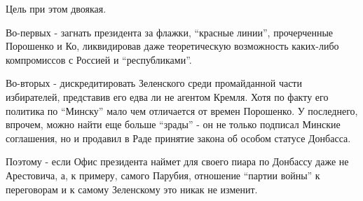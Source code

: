 Цель при этом двоякая.

Во-первых - загнать президента за флажки, \enquote{красные линии}, прочерченные
Порошенко и Ко, ликвидировав даже теоретическую возможность каких-либо
компромиссов с Россией и \enquote{республиками}. 

Во-вторых - дискредитировать Зеленского среди промайданной части
избирателей, представив его едва ли не агентом Кремля. Хотя по факту его
политика по \enquote{Минску} мало чем отличается от времен Порошенко. У
последнего, впрочем, можно найти еще больше \enquote{зрады} - он не только
подписал Минские соглашения, но и продавил в Раде принятие закона об
особом статусе Донбасса. 

Поэтому - если Офис президента наймет для своего пиара по Донбассу даже не
Арестовича, а, к примеру, самого Парубия, отношение \enquote{партии войны} к
переговорам и к самому Зеленскому это никак не изменит.
